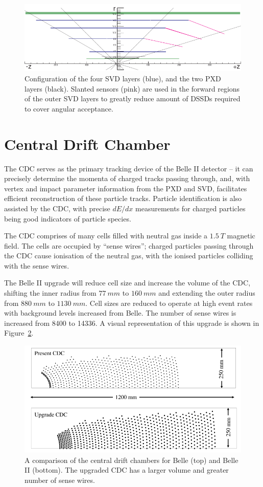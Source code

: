 \documentclass[12pt]{thesis}  %
\begin{document}
\begin{figure}[h]
\centering
\includegraphics[width=0.8\linewidth]{images/svd.png}
\caption[]%
{{\small Configuration of the four SVD layers (blue), and the two PXD layers (black). Slanted sensors (pink) are used in the forward regions of the outer SVD layers to greatly reduce amount of DSSDs required to cover angular acceptance.}}
\label{fig:svd}
\end{figure} 


\section{Central Drift Chamber}

The CDC serves as the primary tracking device of the Belle II detector -- it can precisely determine the momenta of charged tracks passing through, and, with vertex and impact parameter information from the PXD and SVD, facilitates efficient reconstruction of these particle tracks. Particle identification is also assisted by the CDC, with precise $dE/dx$ measurements for charged particles being good indicators of particle species.

The CDC comprises of many cells filled with neutral gas inside a $\SI{1.5}{T}$ magnetic field. The cells are occupied by ``sense wires''; charged particles passing through the CDC cause ionisation of the neutral gas, with the ionised particles colliding with the sense wires.
 
The Belle II upgrade will reduce cell size and increase the volume of the CDC, shifting the inner radius from $\SI{77}{mm}$ to $\SI{160}{mm}$ and extending the outer radius from $\SI{880}{mm}$ to $\SI{1130}{mm}$. Cell sizes are reduced to operate at high event rates with background levels increased from Belle. The number of sense wires is increased from \num{8400} to \num{14336}. A visual representation of this upgrade is shown in Figure~\ref{fig:cdc}.

\begin{figure}[h]
\centering
\includegraphics[width=0.7\linewidth]{images/cdc.png}
\caption[]%
{{\small A comparison of the central drift chambers for Belle (top) and Belle II (bottom). The upgraded CDC has a larger volume and greater number of sense wires.}}
\label{fig:cdc}
\end{figure} 
\end{document}
